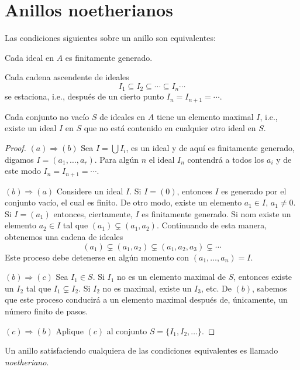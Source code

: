 \section{Anillos noetherianos}

\begin{lemma}
  Las condiciones siguientes sobre un anillo son equivalentes:
  \begin{subtheorem}
    \item Cada ideal en $A$ es finitamente generado.
    \item Cada cadena ascendente de ideales
      \[ I_1 \subseteq I_2 \subseteq \cdots \subseteq I_n \cdots \]
      se estaciona, i.e., después de un cierto punto $I_n = I_{n+1} = \cdots$.
    \item Cada conjunto no vacío $S$ de ideales en $A$ tiene un elemento maximal $I$, i.e., existe un ideal $I$ en $S$ que no está contenido en cualquier otro ideal en $S$.
  \end{subtheorem}
\end{lemma}
\begin{proof}
  $(a) \Rightarrow (b)$ Sea $ I = \bigcup I_i$, es un ideal y de aquí es finitamente generado, digamos $I = (a_1,\ldots, a_r)$. Para algún $n$ el ideal $I_n$ contendrá a todos los $a_i$ y de este modo $I_n = I_{n+1} = \cdots$.

  \nextpart
  $(b) \Rightarrow (a)$ Considere un ideal $I$. Si $I = (0)$, entonces $I$ es generado por el conjunto vacío, el cual es finito. De otro modo, existe un elemento $a_1 \in I$, $a_1 \neq 0$. Si $I = (a_1)$ entonces, ciertamente, $I$ es finitamente generado. Si nom existe un elemento $a_2 \in I$ tal que $(a_1) \subsetneq (a_1, a_2)$. Continuando de esta manera, obtenemos una cadena de ideales
  \[
    (a_1) \subsetneq (a_1, a_2) \subsetneq (a_1,a_2,a_3) \subsetneq \cdots
  \]
  Este proceso debe detenerse en algún momento con $(a_1,\ldots,a_n) = I$.

  \nextpart
  $(b)\Rightarrow (c)$ Sea $I_1 \in S$. Si $I_1$ no es un elemento maximal de $S$, entonces existe un $I_2$ tal que $I_1 \subsetneq I_2$. Si $I_2$ no es maximal, existe un $I_3$, etc. De $(b)$, sabemos que este proceso conducirá a un elemento maximal después de, únicamente, un número finito de pasos.

  \nextpart
  $(c)\Rightarrow (b)$ Aplique $(c)$ al conjunto $S = \{I_1,I_2,\ldots\}$.
\end{proof}

Un anillo satisfaciendo cualquiera de las condiciones equivalentes es llamado \emph{noetheriano}.


